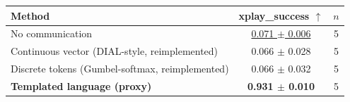 \begin{tabular}{lcc}
\toprule
Method & xplay\_success $\uparrow$ & $n$ \\
\midrule
No communication & \underline{0.071 $\pm$ 0.006} & 5 \\
Continuous vector (DIAL-style, reimplemented) & 0.066 $\pm$ 0.028 & 5 \\
Discrete tokens (Gumbel-softmax, reimplemented) & 0.066 $\pm$ 0.032 & 5 \\
\textbf{Templated language (proxy)} & \textbf{0.931 $\pm$ 0.010} & 5 \\
\bottomrule
\end{tabular}

